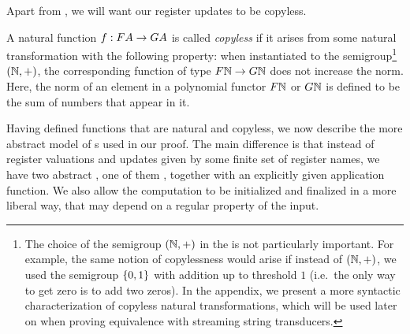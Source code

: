 Apart from , we will want our register updates to be copyless. 

\begin{definition} \label{def:copyless} A natural function $f : \functor A \to \functorg A$ is  called \emph{copyless} if it arises from some natural transformation with the following property:  when instantiated to the semigroup\footnote{The choice of the semigroup $({\mathbb N},+)$ in the  is not particularly important. For example, the same notion of copylessness would arise if instead of $({\mathbb N},+)$, we used the semigroup $\{0,1\}$ with addition up to threshold $1$ (i.e.~the only way to get zero is to add two zeros). In the appendix, we present a more syntactic characterization of copyless natural transformations, which will be used later on when proving equivalence with streaming string transducers. 
    } $({\mathbb N},+)$, the corresponding function of type $\functor \Nat \to \functorg \Nat$ 
    does not increase the norm. Here, the norm of an element in a polynomial functor $\functor \Nat$ or $\functorg \Nat$ is defined to be the sum of numbers that appear in it.
\end{definition}

Having defined functions that are natural and copyless, we now describe the more
abstract model of \sst{}s used in our proof. The main difference is that instead
of register valuations and updates given by some finite set of register names,
we have two abstract , one of them ,
together with an explicitly given application function. We also allow the
computation to be initialized and finalized in a more liberal way, that may depend on a
regular property of the input.

